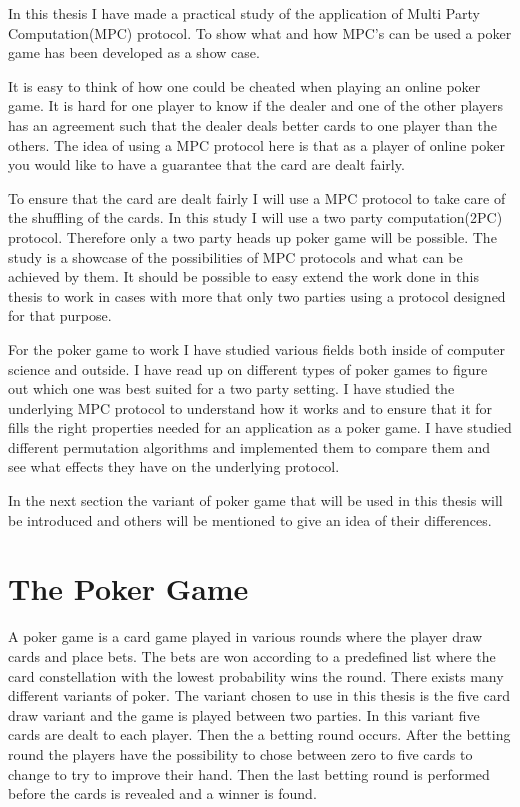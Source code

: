 
In this thesis I have made a practical study of the application of Multi Party Computation(MPC) protocol. To show what and how MPC's can be used a poker game has been developed as a show case.

It is easy to think of how one could be cheated when playing an online poker game. It is hard for one player to know if the dealer and one of the other players has an agreement such that the dealer deals better cards to one player than the others. The idea of using a MPC protocol here is that as a player of online poker you would like to have a guarantee that the card are dealt fairly.

To ensure that the card are dealt fairly I will use a MPC protocol to take care of the shuffling of the cards. In this study I will use a two party computation(2PC) protocol. Therefore only a two party heads up poker game will be possible. The study is a showcase of the possibilities of MPC protocols and what can be achieved by them. It should be possible to easy extend the work done in this thesis to work in cases with more that only two parties using a protocol designed for that purpose.

\bigskip

For the poker game to work I have studied various fields both inside of computer science and outside. I have read up on different types of poker games to figure out which one was best suited for a two party setting. I have studied the underlying MPC protocol to understand how it works and to ensure that it for fills the right properties needed for an application as a poker game. I have studied different permutation algorithms and implemented them to compare them and see what effects they have on the underlying protocol.

\bigskip


\bigskip

In the next section the variant of poker game that will be used in this thesis will be introduced and others will be mentioned to give an idea of their differences.

\section{The Poker Game}
A poker game is a card game played in various rounds where the player draw cards and place bets. The bets are won according to a predefined list where the card constellation with the lowest probability wins the round. There exists many different variants of poker. The variant chosen to use in this thesis is the five card draw variant and the game is played between two parties. In this variant five cards are dealt to each player. Then the a betting round occurs. After the betting round the players have the possibility to chose between zero to five cards to change to try to improve their hand. Then the last betting round is performed before the cards is revealed and a winner is found.

